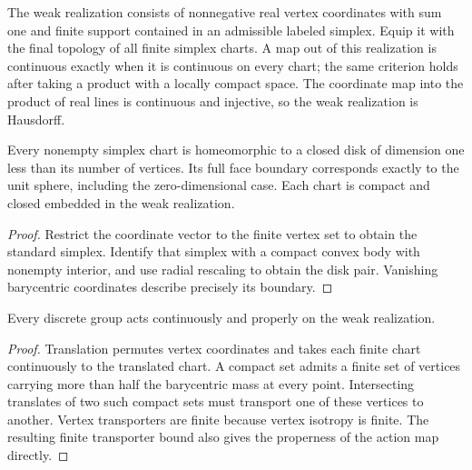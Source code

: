 \begin{definition}\label{def:labeled-weak-realization}
\leanok
The weak realization consists of nonnegative real vertex coordinates with
sum one and finite support contained in an admissible labeled simplex.
Equip it with the final topology of all finite simplex charts. A map out of
this realization is continuous exactly when it is continuous on every chart;
the same criterion holds after taking a product with a locally compact space.
The coordinate map into the product of real lines is continuous and injective,
so the weak realization is Hausdorff.
\end{definition}

\begin{proposition}\label{prop:labeled-simplex-disk-pair}
Every nonempty simplex chart is homeomorphic to a closed disk of dimension
one less than its number of vertices. Its full face boundary corresponds
exactly to the unit sphere, including the zero-dimensional case. Each chart
is compact and closed embedded in the weak realization.
\end{proposition}
\begin{proof}
\leanok
Restrict the coordinate vector to the finite vertex set to obtain the standard
simplex. Identify that simplex with a compact convex body with nonempty
interior, and use radial rescaling to obtain the disk pair. Vanishing
barycentric coordinates describe precisely its boundary.
\end{proof}

\begin{proposition}\label{prop:labeled-realization-proper}
Every discrete group acts continuously and properly on the weak realization.
\end{proposition}
\begin{proof}
\leanok
Translation permutes vertex coordinates and takes each finite chart
continuously to the translated chart. A compact set admits a finite set of
vertices carrying more than half the barycentric mass at every point.
Intersecting translates of two such compact sets must transport one of these
vertices to another. Vertex transporters are finite because vertex isotropy
is finite. The resulting finite transporter bound also gives the properness
of the action map directly.
\end{proof}

